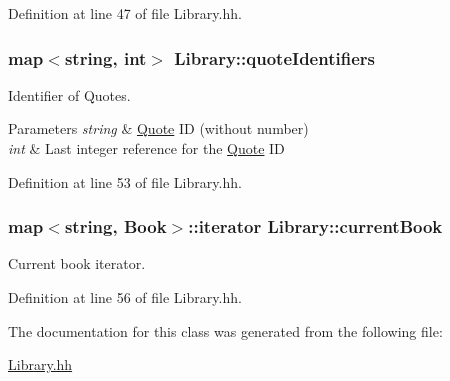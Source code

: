 Definition at line 47 of file Library.\+hh.

\subsubsection[{\texorpdfstring{quote\+Identifiers}{quoteIdentifiers}}]{\setlength{\rightskip}{0pt plus 5cm}map$<$string, int$>$ Library\+::quote\+Identifiers\hspace{0.3cm}{\ttfamily [private]}}\hypertarget{class_library_a58c1f12a0278872cd0299e586551bb7a}{}\label{class_library_a58c1f12a0278872cd0299e586551bb7a}


Identifier of Quotes. 


\begin{DoxyParams}{Parameters}
{\em string} & \hyperlink{class_quote}{Quote} ID (without number) \\
\hline
{\em int} & Last integer reference for the \hyperlink{class_quote}{Quote} ID \\
\hline
\end{DoxyParams}


Definition at line 53 of file Library.\+hh.

\subsubsection[{\texorpdfstring{current\+Book}{currentBook}}]{\setlength{\rightskip}{0pt plus 5cm}map$<$string, {\bf Book}$>$\+::iterator Library\+::current\+Book\hspace{0.3cm}{\ttfamily [private]}}\hypertarget{class_library_a78a4071e8d610da671b3886c71900dae}{}\label{class_library_a78a4071e8d610da671b3886c71900dae}


Current book iterator. 



Definition at line 56 of file Library.\+hh.



The documentation for this class was generated from the following file\+:\begin{DoxyCompactItemize}
\item 
\hyperlink{_library_8hh}{Library.\+hh}\end{DoxyCompactItemize}
